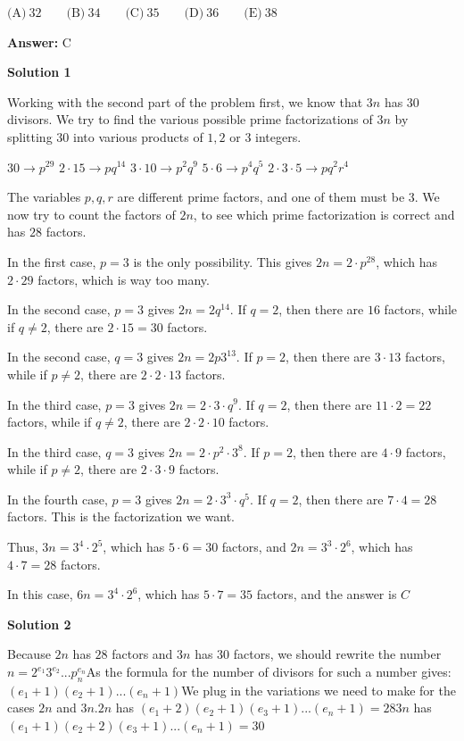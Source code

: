 \begin{enumerate}
 $\text{(A)}\ 32\qquad\text{(B)}\ 34\qquad\text{(C)}\ 35\qquad\text{(D)}\ 36\qquad\text{(E)}\ 38$

 \textbf{Answer: }C



\textbf{Solution 1}

Working with the second part of the problem first, we know that $3n$ has $30$ divisors.  We try to find the various possible prime factorizations of $3n$ by splitting $30$ into various products of $1, 2$ or $3$ integers.

 $30 \rightarrow p^{29}$
$2 \cdot 15 \rightarrow pq^{14}$
$3\cdot 10 \rightarrow p^2q^9$
$5\cdot 6 \rightarrow p^4q^5$
$2\cdot 3\cdot 5 \rightarrow pq^2r^4$

 The variables $p, q, r$ are different prime factors, and one of them must be $3$.  We now try to count the factors of $2n$, to see which prime factorization is correct and has $28$ factors.

 In the first case, $p=3$ is the only possibility.  This gives $2n = 2\cdot p^{28}$, which has $2\cdot {29}$ factors, which is way too many.

 In the second case, $p=3$ gives $2n = 2q^{14}$.  If $q=2$, then there are $16$ factors, while if $q\neq 2$, there are $2\cdot 15 = 30$ factors.

 In the second case, $q=3$ gives $2n = 2p3^{13}$.  If $p=2$, then there are $3\cdot 13$ factors, while if $p\neq 2$, there are $2\cdot 2 \cdot 13$ factors.

 In the third case, $p=3$ gives $2n = 2\cdot 3\cdot q^9$.  If $q=2$, then there are $11\cdot 2 = 22$ factors, while if $q \neq 2$, there are $2\cdot 2\cdot 10$ factors.

 In the third case, $q=3$ gives $2n = 2\cdot p^2\cdot 3^8$.  If $p=2$, then there are $4\cdot 9$ factors, while if $p \neq 2$, there are $2\cdot 3\cdot 9$ factors.

 In the fourth case, $p=3$ gives $2n = 2\cdot 3^3\cdot q^5$.  If $q=2$, then there are $7\cdot 4= 28$ factors.  This is the factorization we want.

 Thus, $3n = 3^4 \cdot 2^5$, which has $5\cdot 6 = 30$ factors, and $2n = 3^3 \cdot 2^6$, which has $4\cdot 7 = 28$ factors.

 In this case, $6n = 3^4\cdot 2^6$, which has $5\cdot 7 = 35$ factors, and the answer is $\boxed{C}$




\textbf{Solution 2}

Because $2n$ has $28$ factors and $3n$ has $30$ factors, we should rewrite the number $n = 2^{e_1}3^{e_2}... p_n^{e_n}$As the formula for the number of divisors for such a number gives:$(e_1+1)(e_2+1)... (e_n+1)$We plug in the variations we need to make for the cases $2n$ and $3n$.$2n$ has $(e_1+2)(e_2+1)(e_3+1)... (e_n+1) = 28$$3n$ has $(e_1+1)(e_2+2)(e_3+1)...(e_n+1) = 30$


\end{enumerate}
